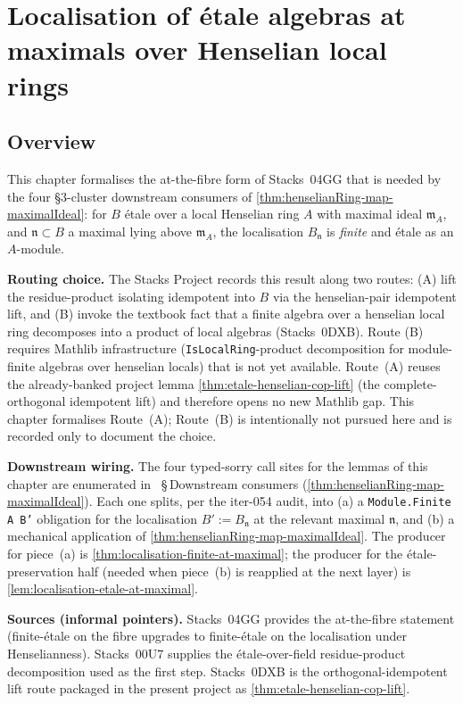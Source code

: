 \chapter{Localisation of étale algebras at maximals over Henselian local rings}
\label{ch:Proetale_Mathlib_RingTheory_Etale_LocalisationFiniteAtMaximal}

\section{Overview}

This chapter formalises the at-the-fibre form of Stacks~04GG that
is needed by the four \S3-cluster downstream consumers of
\cref{thm:henselianRing-map-maximalIdeal}: for $B$ étale over a
local Henselian ring $A$ with maximal ideal $\mathfrak m_A$, and
$\mathfrak n \subset B$ a maximal lying above $\mathfrak m_A$,
the localisation $B_{\mathfrak n}$ is \emph{finite} and étale as
an $A$-module.

\textbf{Routing choice.} The Stacks Project records this result
along two routes: (A) lift the residue-product isolating
idempotent into $B$ via the henselian-pair idempotent lift, and
(B) invoke the textbook fact that a finite algebra over a
henselian local ring decomposes into a product of local algebras
(Stacks~0DXB). Route (B) requires Mathlib infrastructure
(\texttt{IsLocalRing}-product decomposition for module-finite
algebras over henselian locals) that is not yet available.
Route~(A) reuses the already-banked project lemma
\cref{thm:etale-henselian-cop-lift} (the complete-orthogonal
idempotent lift) and therefore opens no new Mathlib gap. This
chapter formalises Route~(A); Route~(B) is intentionally not
pursued here and is recorded only to document the choice.

\textbf{Downstream wiring.} The four typed-sorry call sites for
the lemmas of this chapter are enumerated in
~\S\,Downstream
consumers (\cref{thm:henselianRing-map-maximalIdeal}). Each one
splits, per the iter-054 audit, into (a) a
\texttt{Module.Finite A B'} obligation for the localisation $B' :=
B_{\mathfrak n}$ at the relevant maximal $\mathfrak n$, and (b) a
mechanical application of
\cref{thm:henselianRing-map-maximalIdeal}. The producer for
piece~(a) is \cref{thm:localisation-finite-at-maximal}; the
producer for the étale-preservation half (needed when piece~(b)
is reapplied at the next layer) is
\cref{lem:localisation-etale-at-maximal}.

\textbf{Sources (informal pointers).} Stacks~04GG provides the
at-the-fibre statement (finite-étale on the fibre upgrades to
finite-étale on the localisation under Henselianness).
Stacks~00U7 supplies the étale-over-field residue-product
decomposition used as the first step. Stacks~0DXB is the
orthogonal-idempotent lift route packaged in the present project
as \cref{thm:etale-henselian-cop-lift}.

